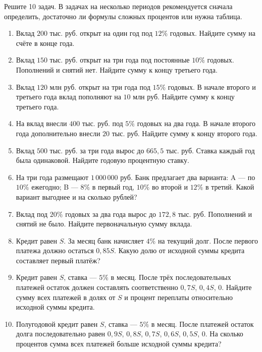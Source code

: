 \documentclass[a4paper,12pt]{article}
\begin{document}
Решите 10 задач. В задачах на несколько периодов рекомендуется сначала определить, достаточно ли формулы сложных процентов или нужна таблица.

\begin{enumerate}[label=\textbf{\arabic*.}]
\item Вклад $200$ тыс. руб. открыт на один год под $12\%$ годовых. Найдите сумму на счёте в конце года.

\item Вклад $150$ тыс. руб. открыт на три года под постоянные $10\%$ годовых. Пополнений и снятий нет. Найдите сумму к концу третьего года.

\item Вклад $120$ млн руб. открыт на три года под $15\%$ годовых. В начале второго и третьего года вклад пополняют на $10$ млн руб. Найдите сумму к концу третьего года.

\item На вклад внесли $400$ тыс. руб. под $5\%$ годовых на два года. В начале второго года дополнительно внесли $20$ тыс. руб. Найдите сумму к концу второго года.

\item Вклад $500$ тыс. руб. за три года вырос до $665{,}5$ тыс. руб. Ставка каждый год была одинаковой. Найдите годовую процентную ставку.

\item На три года размещают $1\,000\,000$ руб. Банк предлагает два варианта: A --- по $10\%$ ежегодно; B --- $8\%$ в первый год, $10\%$ во второй и $12\%$ в третий. Какой вариант выгоднее и на сколько рублей?

\item Вклад под $20\%$ годовых за два года вырос до $172{,}8$ тыс. руб. Пополнений и снятий не было. Найдите первоначальную сумму вклада.

\item Кредит равен $S$. За месяц банк начисляет $4\%$ на текущий долг. После первого платежа должно остаться $0{,}85S$. Какую долю от исходной суммы кредита составляет первый платёж?

\item Кредит равен $S$, ставка --- $5\%$ в месяц. После трёх последовательных платежей остаток должен составлять соответственно $0{,}7S$, $0{,}4S$, $0$. Найдите сумму всех платежей в долях от $S$ и процент переплаты относительно исходной суммы кредита.

\item Полугодовой кредит равен $S$, ставка --- $5\%$ в месяц. После платежей остаток долга последовательно равен $0{,}9S$, $0{,}8S$, $0{,}7S$, $0{,}6S$, $0{,}5S$, $0$. На сколько процентов сумма всех платежей больше исходной суммы кредита?
\end{enumerate}
\end{document}

